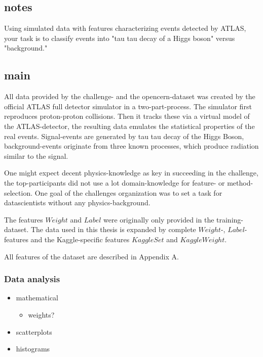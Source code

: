 

\subsection{notes}
Using simulated data with features characterizing events detected by ATLAS, your task is to classify events into "tau tau decay of a Higgs boson" versus "background."

\subsection{main}
All data provided by the challenge- and the opencern-dataset \cite{higgsData} was created by the official ATLAS full detector simulator in a two-part-process. The simulator first reproduces proton-proton collisions. Then it tracks these via a virtual model of the ATLAS-detector, the resulting data emulates the statistical properties of the real events.
Signal-events are generated by tau tau decay of the Higgs Boson, background-events originate from three known processes, which produce radiation similar to the signal.
\cite{higgsPaper}


One might expect decent physics-knowledge as key in succeeding in the challenge, the top-participants did not use a lot domain-knowledge for feature- or method-selection. One goal of the challenges organization was to set a task for datascientists without any physics-background.\cite{higgsPaper}



%



The features $Weight$ and $Label$ were originally only provided in the training-dataset. The data used in this thesis is expanded by complete $Weight$-, $Label$-features and the Kaggle-specific features $KaggleSet$ and $KaggleWeight$.

All features of the dataset are described in Appendix A.

\subsubsection{Data analysis}
\begin{itemize}
	\item mathematical
	\begin{itemize}
		\item weights?
	\end{itemize}
	\item scatterplots
	\item histograms
\end{itemize}
